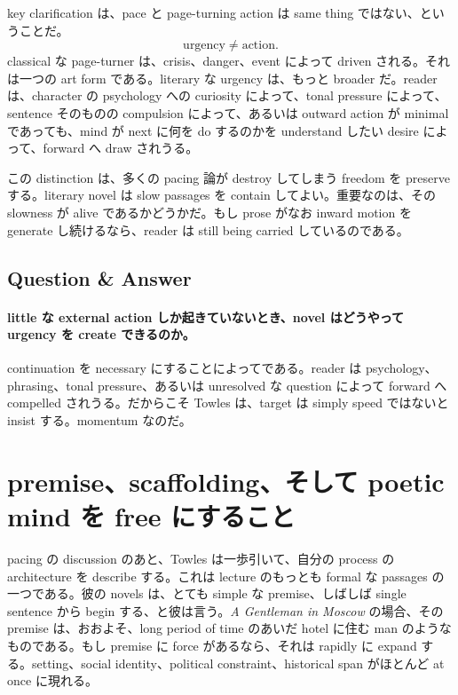 key clarification は、pace と page-turning action は same thing ではない、ということだ。
\begin{equation}
\text{urgency} \neq \text{action}.
\end{equation}
classical な page-turner は、crisis、danger、event によって driven される。それは一つの art form である。literary な urgency は、もっと broader だ。reader は、character の psychology への curiosity によって、tonal pressure によって、sentence そのものの compulsion によって、あるいは outward action が minimal であっても、mind が next に何を do するのかを understand したい desire によって、forward へ draw されうる。

この distinction は、多くの pacing 論が destroy してしまう freedom を preserve する。literary novel は slow passages を contain してよい。重要なのは、その slowness が alive であるかどうかだ。もし prose がなお inward motion を generate し続けるなら、reader は still being carried しているのである。

\subsection{Question \& Answer}

\paragraph{little な external action しか起きていないとき、novel はどうやって urgency を create できるのか。}

continuation を necessary にすることによってである。reader は psychology、phrasing、tonal pressure、あるいは unresolved な question によって forward へ compelled されうる。だからこそ Towles は、target は simply speed ではないと insist する。momentum なのだ。

\section{premise、scaffolding、そして poetic mind を free にすること}

pacing の discussion のあと、Towles は一歩引いて、自分の process の architecture を describe する。これは lecture のもっとも formal な passages の一つである。彼の novels は、とても simple な premise、しばしば single sentence から begin する、と彼は言う。\emph{A Gentleman in Moscow} の場合、その premise は、おおよそ、long period of time のあいだ hotel に住む man のようなものである。もし premise に force があるなら、それは rapidly に expand する。setting、social identity、political constraint、historical span がほとんど at once に現れる。

